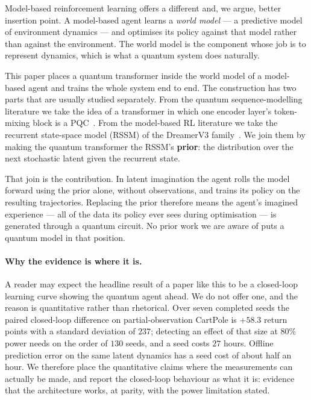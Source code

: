 \documentclass[11pt]{article}
\begin{document}
Model-based reinforcement learning offers a different and, we argue,
better insertion point. A model-based agent learns a \emph{world
model} --- a predictive model of environment dynamics --- and optimises
its policy against that model rather than against the environment. The
world model is the component whose job is to represent dynamics, which
is what a quantum system does naturally.

This paper places a quantum transformer inside the world model of a
model-based agent and trains the whole system end to end. The
construction has two parts that are usually studied separately. From the
quantum sequence-modelling literature we take the idea of a transformer
in which one encoder layer's token-mixing block is a
PQC~\cite{qasa}. From the model-based RL literature we take the
recurrent state-space model (RSSM) of the DreamerV3
family~\cite{hafner2023}. We join them by making the quantum
transformer the RSSM's \textbf{prior}: the distribution over the next
stochastic latent given the recurrent state.

That join is the contribution. In latent imagination the agent rolls the
model forward using the prior alone, without observations, and trains
its policy on the resulting trajectories. Replacing the prior therefore
means the agent's imagined experience --- all of the data its policy
ever sees during optimisation --- is generated through a quantum
circuit. No prior work we are aware of puts a quantum model in that
position.

\paragraph{Why the evidence is where it is.}
A reader may expect the headline result of a paper like this to be a
closed-loop learning curve showing the quantum agent ahead. We do not
offer one, and the reason is quantitative rather than rhetorical. Over
seven completed seeds the paired closed-loop difference on partial-observation
CartPole is $+58.3$ return points with a standard deviation of $237$;
detecting an effect of that size at $80\%$ power needs on the order of
$130$ seeds, and a seed costs $27$ hours. Offline prediction error on
the same latent dynamics has a seed cost of about half an hour. We
therefore place the quantitative claims where the measurements can
actually be made, and report the closed-loop behaviour as what it
is: evidence that the architecture works, at parity, with the power
limitation stated.
\end{document}
